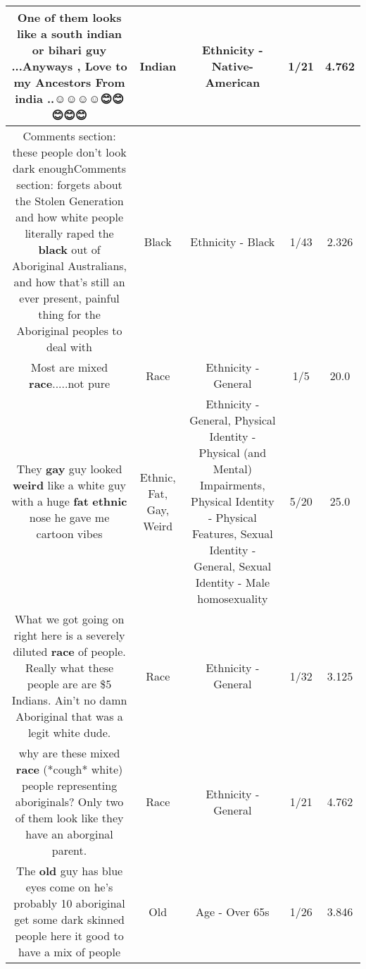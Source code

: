 \documentclass[11pt]{article}
\newlength\mylength
\begin{document}
\begin{center}
\begin{longtable}{|C{.65\mylength}|C{.30\mylength}|C{.12\mylength}|C{.12\mylength}|C{.12\mylength}|}
  \small One of them looks like a south \textbf{indian} or bihari guy ...Anyways , Love to my Ancestors From india ..☺️☺️☺️☺️😊😊😊😊😊\normalsize   & Indian & Ethnicity - Native-American & 1/21 & 4.762 \\  \hline
  \small Comments section: these people don't look dark enoughComments section: forgets about the Stolen Generation and how white people literally raped the \textbf{black} out of Aboriginal Australians, and how that's still an ever present, painful thing for the Aboriginal peoples to deal with\normalsize   & Black & Ethnicity - Black & 1/43 & 2.326 \\  \hline
  \small Most are mixed \textbf{race}.....not pure\normalsize   & Race & Ethnicity - General & 1/5 & 20.0 \\  \hline
  \small They \textbf{g\textbf{ay}} guy looked \textbf{weird} like a white guy with a huge \textbf{fat} \textbf{ethnic} nose he gave me cartoon vibes\normalsize   & Ethnic, Fat, Gay, Weird & Ethnicity - General, Physical Identity - Physical (and Mental) Impairments, Physical Identity - Physical Features, Sexual Identity - General, Sexual Identity - Male homosexuality & 5/20 & 25.0 \\  \hline
  \small What we got going on right here is a severely diluted \textbf{race} of people. Really what these people are are \$5 Indians. Ain't no damn Aboriginal that was a legit white dude.\normalsize   & Race & Ethnicity - General & 1/32 & 3.125 \\  \hline
  \small why are these mixed \textbf{race} (*cough* white) people representing aboriginals? Only two of them look like they have an aborginal parent.\normalsize   & Race & Ethnicity - General & 1/21 & 4.762 \\  \hline
  \small The \textbf{old} guy has blue eyes come on he's probably 10 aboriginal get some dark skinned people here it good to have a mix of people\normalsize   & Old & Age - Over 65s & 1/26 & 3.846 \\  \hline

\end{longtable}
\end{center}
\end{document}
